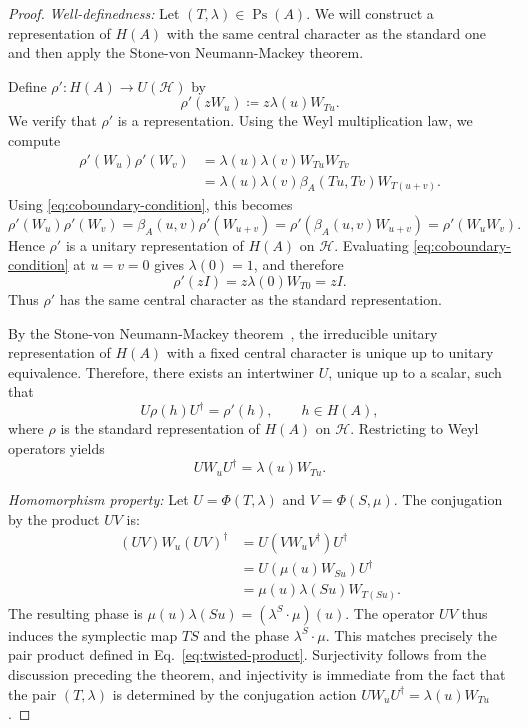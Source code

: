 \documentclass[11pt, reqno]{amsart}
\theoremstyle{definition}
\theoremstyle{remark}
\newcommand{\HH}{\mathcal{H}}
\DeclareMathOperator{\Ps}{Ps}
\begin{document}
\begin{proof}
\emph{Well-definedness:} Let $(T, \lambda) \in \Ps(A)$. We will construct a representation of $H(A)$ with the same central character as the standard one and then apply the Stone-von Neumann-Mackey theorem.

Define $\rho': H(A) \to U(\HH)$ by
\[
    \rho'(z W_u) \coloneqq z \lambda(u) W_{Tu}.
\]
We verify that $\rho'$ is a representation. Using the Weyl multiplication law, we compute
\begin{align*}
    \rho'(W_u)\rho'(W_v) &= \lambda(u)\lambda(v) W_{Tu} W_{Tv} \\
    &= \lambda(u)\lambda(v) \beta_A(Tu, Tv) W_{T(u+v)}.
\end{align*}
Using \eqref{eq:coboundary-condition}, this becomes
\[
    \rho'(W_u)\rho'(W_v) = \beta_A(u, v) \rho'(W_{u+v}) = \rho'(\beta_A(u, v) W_{u+v}) = \rho'(W_u W_v).
\]
Hence $\rho'$ is a unitary representation of $H(A)$ on $\HH$. Evaluating \eqref{eq:coboundary-condition} at $u=v=0$ gives $\lambda(0)=1$, and therefore
\[
\rho'(zI) = z \lambda(0) W_{T0} = zI.
\]
Thus $\rho'$ has the same central character as the standard representation.

By the Stone-von Neumann-Mackey theorem~\cite{Mackey1958}, the irreducible unitary representation of $H(A)$ with a fixed central character is unique up to unitary equivalence. Therefore, there exists an intertwiner $U$, unique up to a scalar, such that
\[
U \rho(h) U^\dagger = \rho'(h), \qquad h \in H(A),
\]
where $\rho$ is the standard representation of $H(A)$ on $\HH$. Restricting to Weyl operators yields
\[
U W_u U^\dagger = \lambda(u) W_{Tu}.
\]

\emph{Homomorphism property:} Let $U = \Phi(T, \lambda)$ and $V = \Phi(S, \mu)$. The conjugation by the product $UV$ is:
\begin{align}
(UV) W_u (UV)^\dagger &= U (V W_u V^\dagger) U^\dagger \nonumber \\
&= U (\mu(u) W_{Su}) U^\dagger \nonumber \\
&= \mu(u) \lambda(Su) W_{T(Su)}.
\end{align}
The resulting phase is $\mu(u)\lambda(Su) = (\lambda^S \cdot \mu)(u)$. The operator $UV$ thus induces the symplectic map $TS$ and the phase $\lambda^S \cdot \mu$. This matches precisely the pair product defined in Eq.~\eqref{eq:twisted-product}.
Surjectivity follows from the discussion preceding the theorem, and injectivity is immediate from the fact that the pair $(T,\lambda)$ is determined by the conjugation action $U W_u U^\dagger=\lambda(u)W_{Tu}$.
\end{proof}
\end{document}
